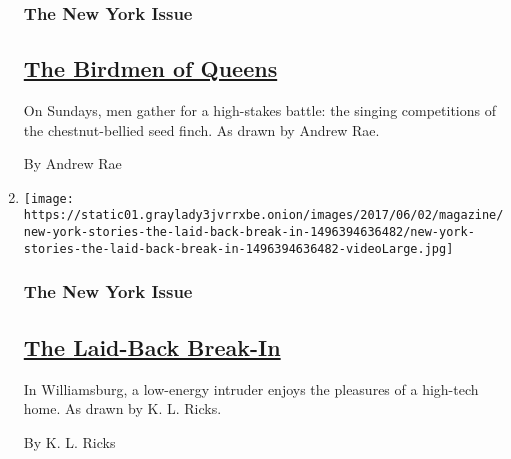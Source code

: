 \begin{enumerate}
  \hypertarget{the-new-york-issue-2}{%
  \subsubsection{The New York Issue}\label{the-new-york-issue-2}}

  \hypertarget{the-birdmen-of-queens}{%
  \subsection{\texorpdfstring{\href{/interactive/2017/06/02/magazine/new-york-stories-the-birdmen-of-queens.html}{The
  Birdmen of
  Queens}}{The Birdmen of Queens}}\label{the-birdmen-of-queens}}

  On Sundays, men gather for a high-stakes battle: the singing
  competitions of the chestnut-bellied seed finch. As drawn by Andrew
  Rae.

  By Andrew Rae
\item
  \texttt{[image: https://static01.graylady3jvrrxbe.onion/images/2017/06/02/magazine/new-york-stories-the-laid-back-break-in-1496394636482/new-york-stories-the-laid-back-break-in-1496394636482-videoLarge.jpg]}

  \hypertarget{the-new-york-issue-3}{%
  \subsubsection{The New York Issue}\label{the-new-york-issue-3}}

  \hypertarget{the-laid-back-break-in}{%
  \subsection{\texorpdfstring{\href{/interactive/2017/06/02/magazine/new-york-stories-the-laid-back-break-in.html}{The
  Laid-Back
  Break-In}}{The Laid-Back Break-In}}\label{the-laid-back-break-in}}

  In Williamsburg, a low-energy intruder enjoys the pleasures of a
  high-tech home. As drawn by K. L. Ricks.

  By K. L. Ricks
\end{enumerate}

